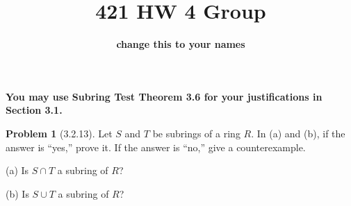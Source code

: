 \documentclass[12pt]{article}
\theoremstyle{definition}
\newtheorem*{prob}{Problem}
\newtheorem*{soln}{Solution}
\newcommand{\QQ}{{\mathbb{Q}}}
\begin{document}
%
\title{421 HW 4 Group}
\author{\textbf{change this to your names}}

\date{}

\maketitle

\textbf{You may use Subring Test Theorem 3.6 for your justifications in Section 3.1.}


%
%


%
%


\begin{prob}[3.2.13]
Let $S$ and $T$ be subrings of a ring $R$. In (a) and (b), if  
the answer is ``yes,'' prove it. If  the answer is ``no,'' give a counterexample.

(a) Is $S \cap T$ a subring of $R$?

(b) Is $S \cup T$ a subring of $R$?
\end{prob}
\end{document}
